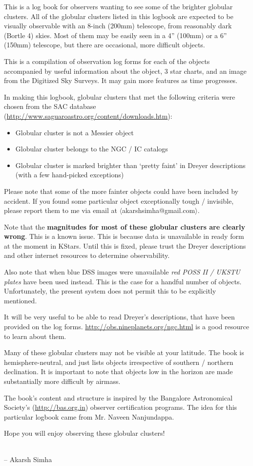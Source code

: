 This is a log book for observers wanting to see some of the brighter
globular clusters. All of the globular clusters listed in this logbook
are expected to be visually observable with an 8-inch (200mm)
telescope, from reasonably dark (Bortle 4) skies. Most of them may be
easily seen in a 4'' (100mm) or a 6'' (150mm) telescope, but there are
occasional, more difficult objects.

This is a compilation of observation log forms for each of the objects
accompanied by useful information about the object, 3 star charts, and
an image from the Digitized Sky Surveys. It may gain more features as
time progresses.

In making this logbook, globular clusters that met the following
criteria were chosen from the SAC database
(\url{http://www.saguaroastro.org/content/downloads.htm}):
\begin{itemize}
\item Globular cluster is not a Messier object
\item Globular cluster belongs to the NGC / IC catalogs
\item Globular cluster is marked brighter than `pretty faint' in
Dreyer descriptions (with a few hand-picked exceptions)
\end{itemize}
Please note that some of the more fainter objects could have been
included by accident. If you found some particular object
exceptionally tough / invisible, please report them to me via email at
$\langle$akarshsimha@gmail.com$\rangle$.

Note that the \textbf{magnitudes for most of these globular clusters
are clearly wrong}. This is a known issue. This is because data is
unavailable in ready form at the moment in KStars. Until this is
fixed, please trust the Dreyer descriptions and other internet
resources to determine observability.

Also note that when blue DSS images were unavailable \emph{red POSS II
/ UKSTU plates} have been used instead. This is the case for a handful
number of objects. Unfortunately, the present system does not permit
this to be explicitly mentioned.

It will be very useful to be able to read Dreyer's descriptions, that
have been provided on the log
forms. \url{http://obs.nineplanets.org/ngc.html} is a good resource to
learn about them.

Many of these globular clusters may not be visible at your
latitude. The book is hemisphere-neutral, and just lists objects
irrespective of southern / northern declination. It is important to
note that objects low in the horizon are made substantially more
difficult by airmass.

The book's content and structure is inspired by the Bangalore
Astronomical Society's (\url{http://bas.org.in}) observer
certification programs. The idea for this particular logbook came from
Mr. Naveen Nanjundappa.

Hope you will enjoy observing these globular clusters!

\\

\hfill -- Akarsh Simha
